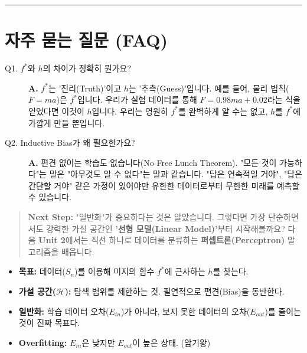 \documentclass[11pt,a4paper]{book}
\theoremstyle{definition}
\begin{document}
\vspace{0.5cm}\hrule\vspace{0.5cm}

\section{자주 묻는 질문 (FAQ)}

\begin{description}
    \item[Q1. $f^*$와 $h$의 차이가 정확히 뭔가요?]
    \textbf{A.} $f^*$는 '진리(Truth)'이고 $h$는 '추측(Guess)'입니다.
    예를 들어, 물리 법칙($F=ma$)은 $f^*$입니다. 우리가 실험 데이터를 통해 $F = 0.98 m a + 0.02$라는 식을 얻었다면 이것이 $h$입니다. 우리는 영원히 $f^*$를 완벽하게 알 수는 없고, $h$를 $f^*$에 가깝게 만들 뿐입니다.
    
    \item[Q2. Inductive Bias가 왜 필요한가요?]
    \textbf{A.} 편견 없이는 학습도 없습니다(No Free Lunch Theorem). "모든 것이 가능하다"는 말은 "아무것도 알 수 없다"는 말과 같습니다. "답은 연속적일 거야", "답은 간단할 거야" 같은 가정이 있어야만 유한한 데이터로부터 무한한 미래를 예측할 수 있습니다.
\end{description}

\vspace{1cm}
\begin{quote}
\textbf{Next Step:} "일반화"가 중요하다는 것은 알았습니다. 그렇다면 가장 단순하면서도 강력한 가설 공간인 \textbf{'선형 모델(Linear Model)'}부터 시작해볼까요? 다음 \textbf{Unit 2}에서는 직선 하나로 데이터를 분류하는 \textbf{퍼셉트론(Perceptron)} 알고리즘을 배웁니다.
\end{quote}

\begin{summarybox}[title={Unit 1 핵심 요약}]
\begin{itemize}
    \item \textbf{목표:} 데이터($S_n$)를 이용해 미지의 함수 $f^*$에 근사하는 $h$를 찾는다.
    \item \textbf{가설 공간($\mathcal{H}$):} 탐색 범위를 제한하는 것. 필연적으로 편견(Bias)을 동반한다.
    \item \textbf{일반화:} 학습 데이터 오차($E_{in}$)가 아니라, 보지 못한 데이터의 오차($E_{out}$)를 줄이는 것이 진짜 목표다.
    \item \textbf{Overfitting:} $E_{in}$은 낮지만 $E_{out}$이 높은 상태. (암기왕)
\end{itemize}
\end{summarybox}
\end{document}
